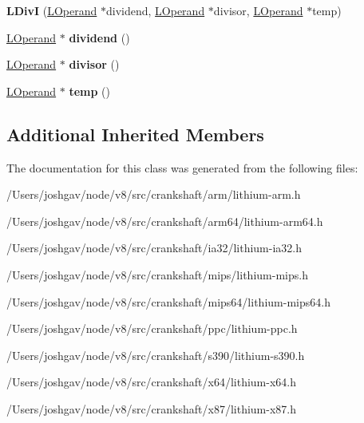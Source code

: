 \begin{DoxyCompactItemize}
\item 
{\bfseries L\+DivI} (\hyperlink{classv8_1_1internal_1_1_l_operand}{L\+Operand} $\ast$dividend, \hyperlink{classv8_1_1internal_1_1_l_operand}{L\+Operand} $\ast$divisor, \hyperlink{classv8_1_1internal_1_1_l_operand}{L\+Operand} $\ast$temp)\hypertarget{classv8_1_1internal_1_1_l_div_i_a2c447a721208972b1aa2bbbdf5ae58c9}{}\label{classv8_1_1internal_1_1_l_div_i_a2c447a721208972b1aa2bbbdf5ae58c9}

\item 
\hyperlink{classv8_1_1internal_1_1_l_operand}{L\+Operand} $\ast$ {\bfseries dividend} ()\hypertarget{classv8_1_1internal_1_1_l_div_i_a324dcd2105a5772942591b32a93edf8c}{}\label{classv8_1_1internal_1_1_l_div_i_a324dcd2105a5772942591b32a93edf8c}

\item 
\hyperlink{classv8_1_1internal_1_1_l_operand}{L\+Operand} $\ast$ {\bfseries divisor} ()\hypertarget{classv8_1_1internal_1_1_l_div_i_a5ceb6d1f5a2f1f0c998966e525a2cb3c}{}\label{classv8_1_1internal_1_1_l_div_i_a5ceb6d1f5a2f1f0c998966e525a2cb3c}

\item 
\hyperlink{classv8_1_1internal_1_1_l_operand}{L\+Operand} $\ast$ {\bfseries temp} ()\hypertarget{classv8_1_1internal_1_1_l_div_i_ab28d8d7ab78227bb8dcc89a205a7c7be}{}\label{classv8_1_1internal_1_1_l_div_i_ab28d8d7ab78227bb8dcc89a205a7c7be}

\end{DoxyCompactItemize}
\subsection*{Additional Inherited Members}


The documentation for this class was generated from the following files\+:\begin{DoxyCompactItemize}
\item 
/\+Users/joshgav/node/v8/src/crankshaft/arm/lithium-\/arm.\+h\item 
/\+Users/joshgav/node/v8/src/crankshaft/arm64/lithium-\/arm64.\+h\item 
/\+Users/joshgav/node/v8/src/crankshaft/ia32/lithium-\/ia32.\+h\item 
/\+Users/joshgav/node/v8/src/crankshaft/mips/lithium-\/mips.\+h\item 
/\+Users/joshgav/node/v8/src/crankshaft/mips64/lithium-\/mips64.\+h\item 
/\+Users/joshgav/node/v8/src/crankshaft/ppc/lithium-\/ppc.\+h\item 
/\+Users/joshgav/node/v8/src/crankshaft/s390/lithium-\/s390.\+h\item 
/\+Users/joshgav/node/v8/src/crankshaft/x64/lithium-\/x64.\+h\item 
/\+Users/joshgav/node/v8/src/crankshaft/x87/lithium-\/x87.\+h\end{DoxyCompactItemize}
